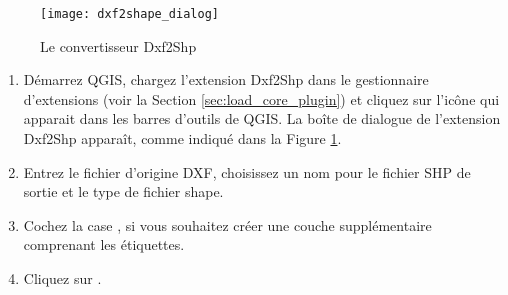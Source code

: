 \begin{figure}[ht]
   \begin{center}
   \caption{Le convertisseur Dxf2Shp\nixcaption}\label{fig:dxf2shape_dialog}\smallskip
   \texttt{[image: dxf2shape\_dialog]}
\end{center}  
\end{figure}

\begin{enumerate}
  \item Démarrez QGIS, chargez l'extension Dxf2Shp dans le gestionnaire d'extensions (voir la Section 
  \ref{sec:load_core_plugin}) et cliquez sur l'icône  
  qui apparait dans les barres d'outils de QGIS. La boîte de dialogue de l'extension Dxf2Shp apparaît, comme indiqué dans la Figure 
  \ref{fig:dxf2shape_dialog}.
  \item Entrez le fichier d'origine DXF, choisissez un nom pour le fichier SHP de sortie et le type de fichier shape.
  \item Cochez la case , si vous souhaitez créer une couche supplémentaire comprenant les étiquettes.
  \item Cliquez sur . 
\end{enumerate}

\newpage
